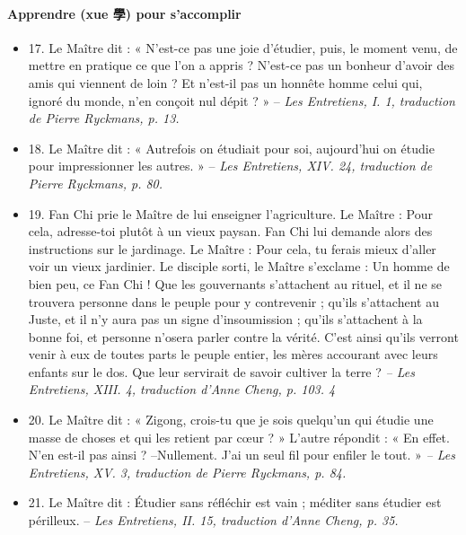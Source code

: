 \paragraph{Apprendre (xue 學) pour s’accomplir   }
\begin{itemize}
    
\item 17. \newline Le Maître dit  : « N’est-ce pas une joie d’étudier, puis, le moment venu, de mettre en pratique ce que l’on a appris ? N’est-ce pas un bonheur d’avoir des amis qui viennent de loin ? Et n’est-il pas un honnête homme celui qui, ignoré du monde, n’en conçoit nul dépit ? » -- \textit{\small Les Entretiens, I. 1, traduction de Pierre Ryckmans, p. 13.  }
\item 18. \newline Le Maître dit : « Autrefois on étudiait pour soi,  aujourd’hui on étudie pour impressionner les autres. » -- \textit{\small Les Entretiens, XIV. 24, traduction de Pierre Ryckmans, p. 80.  }
\item 19. Fan Chi prie  le Maître de lui enseigner l’agriculture. \newline Le Maître : Pour cela, adresse-toi plutôt à un vieux paysan. Fan Chi lui demande alors des instructions sur le jardinage. \newline Le Maître : Pour cela, tu ferais mieux d’aller voir un vieux jardinier.    \newline     Le disciple sorti,  le Maître s’exclame : Un homme de bien peu, ce Fan Chi ! Que les gouvernants s’attachent au rituel, et il ne se trouvera personne dans le peuple pour y contrevenir ; qu’ils s’attachent au Juste, et il n’y aura pas un signe d’insoumission ; qu’ils s’attachent à la bonne foi, et personne n’osera parler contre la vérité. C’est ainsi qu’ils verront venir à eux de toutes parts le peuple entier, les mères accourant avec leurs enfants sur le dos. Que leur servirait de savoir cultiver la terre ? \textit{\small -- Les Entretiens, XIII. 4, traduction d’Anne Cheng, p. 103.    4 }

\item 20. \newline Le Maître dit : « Zigong, crois-tu que je sois quelqu’un qui étudie une masse de choses et qui les retient par cœur ? » \newline L’autre répondit : « En effet. N’en est-il pas ainsi ? \newline –Nullement. J’ai un seul fil pour enfiler le tout. » \textit{\small -- Les Entretiens, XV. 3, traduction de Pierre Ryckmans, p. 84.  }
\item 21. \newline Le Maître dit : Étudier sans réfléchir est vain ; méditer sans étudier est périlleux. -- \textit{\small Les Entretiens, II. 15, traduction d’Anne Cheng, p. 35.   }

\end{itemize}
